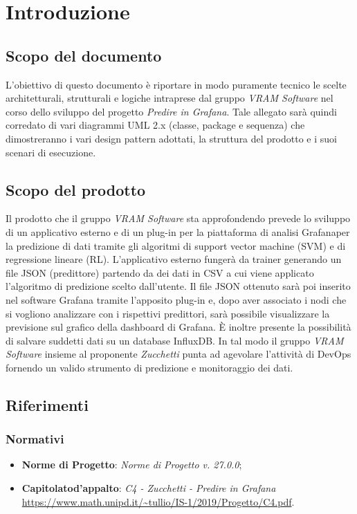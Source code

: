 \section{Introduzione}
    \subsection{Scopo del documento}
        L'obiettivo di questo documento è riportare in modo puramente tecnico le scelte architetturali, strutturali e logiche intraprese dal gruppo \textit{VRAM Software} nel corso dello sviluppo del progetto \textit{Predire in Grafana}. Tale allegato sarà quindi corredato di vari diagrammi UML 2.x (classe, package e sequenza) che dimostreranno i vari design pattern adottati, la struttura del prodotto e i suoi scenari di esecuzione.
    \subsection{Scopo del prodotto}
        Il prodotto che il gruppo \textit{VRAM Software} sta approfondendo prevede lo sviluppo di un applicativo esterno e di un plug-in per la piattaforma di analisi Grafana\glosp per la predizione di dati tramite gli algoritmi di support vector machine (SVM) e di regressione lineare (RL). L'applicativo esterno fungerà da trainer generando un file JSON (predittore) partendo da dei dati in CSV a cui viene applicato l'algoritmo di predizione scelto dall'utente. Il file JSON ottenuto sarà poi inserito nel software Grafana tramite l'apposito plug-in e, dopo aver associato i nodi che si vogliono analizzare con i rispettivi predittori, sarà possibile visualizzare la previsione sul grafico della dashboard di Grafana. È inoltre presente la possibilità di salvare suddetti dati su un database InfluxDB. In tal modo il gruppo \textit{VRAM Software} insieme al proponente \textit{Zucchetti} punta ad agevolare l'attività di DevOps fornendo un valido strumento di predizione e monitoraggio dei dati.
    \subsection{Riferimenti}
        \subsubsection{Normativi}
            \begin{itemize}
                \item \textbf{Norme di Progetto}: \textit{Norme di Progetto v. 27.0.0};
                \item \textbf{Capitolato}\glosp \textbf{d'appalto}: \textit{C4 - Zucchetti - Predire in Grafana} \\
                 \url{https://www.math.unipd.it/~tullio/IS-1/2019/Progetto/C4.pdf}.
            \end{itemize}
